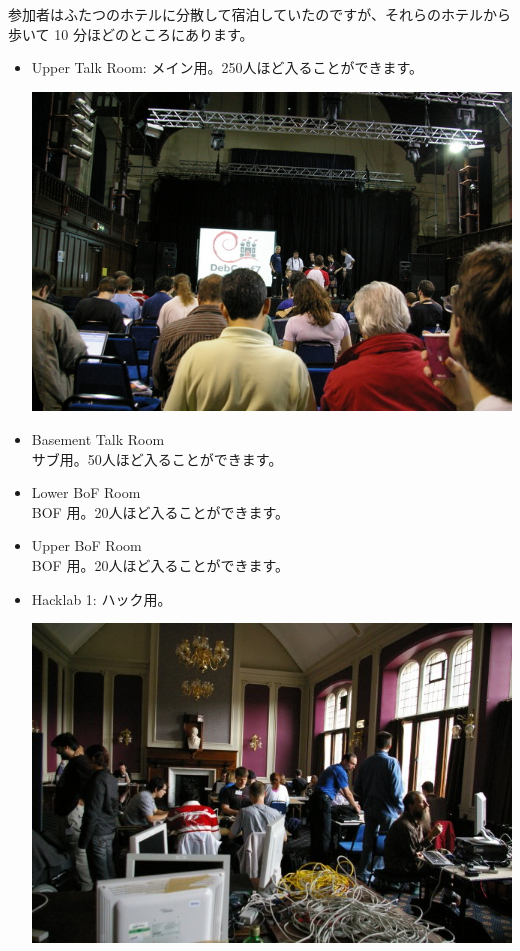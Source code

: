 \documentclass[mingoth,a4paper]{jsarticle}
\begin{document}
 参加者はふたつのホテルに分散して宿泊していたのですが、それらのホテルから歩いて
  10 分ほどのところにあります。
\\

\begin{itemize}
  \item Upper Talk Room: 	メイン用。250人ほど入ることができます。\\
	\begin{minipage}{0.4\hsize}
	\includegraphics[width=0.8\hsize]{image200706/debconf7-upper-talk.jpg}
	\end{minipage}
  \item Basement Talk Room\\
	サブ用。50人ほど入ることができます。
  \item Lower BoF Room\\
	BOF 用。20人ほど入ることができます。
  \item Upper BoF Room\\
	BOF 用。20人ほど入ることができます。
  \item Hacklab 1: 	ハック用。\\
	\begin{minipage}{0.4\hsize}
	\includegraphics[width=0.8\hsize]{image200706/debconf7-hacklab00.jpg}
	\end{minipage}


\end{itemize}
\end{document}
